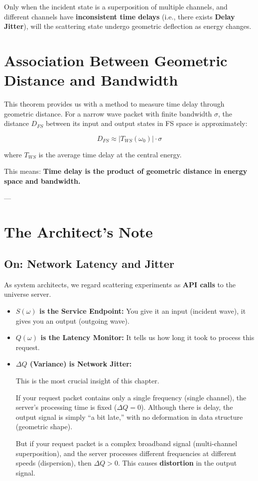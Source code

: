 Only when the incident state is a superposition of multiple channels, and different channels have \textbf{inconsistent time delays} (i.e., there exists \textbf{Delay Jitter}), will the scattering state undergo geometric deflection as energy changes.

\section{Association Between Geometric Distance and Bandwidth}

This theorem provides us with a method to measure time delay through geometric distance. For a narrow wave packet with finite bandwidth $\sigma$, the distance $D_{FS}$ between its input and output states in FS space is approximately:

$$D_{FS} \approx |T_{WS}(\omega_0)| \cdot \sigma$$

where $T_{WS}$ is the average time delay at the central energy.

This means: \textbf{Time delay is the product of geometric distance in energy space and bandwidth.}

---

\section{The Architect's Note}

\subsection{On: Network Latency and Jitter}

As system architects, we regard scattering experiments as \textbf{API calls} to the universe server.

\begin{itemize}
\item \textbf{$S(\omega)$ is the Service Endpoint:} You give it an input (incident wave), it gives you an output (outgoing wave).

\item \textbf{$Q(\omega)$ is the Latency Monitor:} It tells us how long it took to process this request.

\item \textbf{$\Delta Q$ (Variance) is Network Jitter:}

    This is the most crucial insight of this chapter.

    If your request packet contains only a single frequency (single channel), the server's processing time is fixed ($\Delta Q=0$). Although there is delay, the output signal is simply ``a bit late,'' with no deformation in data structure (geometric shape).

    But if your request packet is a complex broadband signal (multi-channel superposition), and the server processes different frequencies at different speeds (dispersion), then $\Delta Q > 0$. This causes \textbf{distortion} in the output signal.
\end{itemize}

